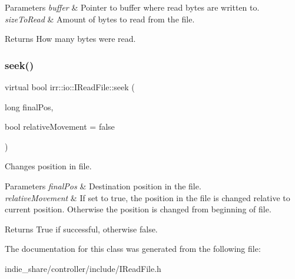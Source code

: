 \begin{DoxyParams}{Parameters}
{\em buffer} & Pointer to buffer where read bytes are written to. \\
\hline
{\em size\+To\+Read} & Amount of bytes to read from the file. \\
\hline
\end{DoxyParams}
\begin{DoxyReturn}{Returns}
How many bytes were read. 
\end{DoxyReturn}
\mbox{\label{classirr_1_1io_1_1IReadFile_ac1cd81f18832e8703838d7abd495bf34}} 
\subsubsection{\texorpdfstring{seek()}{seek()}}
{\footnotesize\ttfamily virtual bool irr\+::io\+::\+I\+Read\+File\+::seek (\begin{DoxyParamCaption}\item[{long}]{final\+Pos,  }\item[{bool}]{relative\+Movement = {\ttfamily false} }\end{DoxyParamCaption})\hspace{0.3cm}{\ttfamily [pure virtual]}}



Changes position in file. 


\begin{DoxyParams}{Parameters}
{\em final\+Pos} & Destination position in the file. \\
\hline
{\em relative\+Movement} & If set to true, the position in the file is changed relative to current position. Otherwise the position is changed from beginning of file. \\
\hline
\end{DoxyParams}
\begin{DoxyReturn}{Returns}
True if successful, otherwise false. 
\end{DoxyReturn}


The documentation for this class was generated from the following file\+:\begin{DoxyCompactItemize}
\item 
indie\+\_\+share/controller/include/I\+Read\+File.\+h\end{DoxyCompactItemize}
